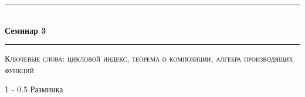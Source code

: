 \documentclass[a5paper]{article}
\makeatletter
\def \topic {Семинар 3}
\theoremstyle{definition}
\renewcommand{\section}{\@startsection
{section}%
{1}%
{\z@}%
{-\baselineskip}%
{0.5\baselineskip}%
{\centering\large\scshape}} %
\makeatother
\begin{document}
\begin{center}

\newcommand{\HRule}{\rule{\linewidth}{0.5mm}}
\HRule \\[0.2cm]
{ \Large \bfseries \topic} %
\HRule

\end{center}

\textsc{Ключевые слова: 
цикловой индекс, теорема о композиции, алгебра производящих функций}


% 

%
%

\section{Разминка}
\end{document}
